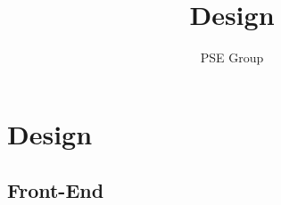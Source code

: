 \documentclass[oneside, english, final]{design}
\author{PSE Group}
\title{
Design}
\begin{document}
\nocite{*}

\setpdf

\maketitle


\thispagestyle{empty}
\begin{abstract}
	\thispagestyle{empty}
\end{abstract}

\thispagestyle{empty}
\newpage
\thispagestyle{empty}
\tableofcontents
\cleardoublepage
\setcounter{page}{1}


\section{Design}\label{sec:intro}
\subsection{Front-End}
\end{document}

